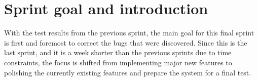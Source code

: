 \section{Sprint goal and introduction}
With the test results from the previous sprint, the main goal for this final sprint is first and foremost to correct the bugs that were discovered.
Since this is the last sprint, and it is a week shorter than the previous sprints due to time constraints, the focus is shifted from implementing major new features to polishing the currently existing features and prepare the system for a final test.